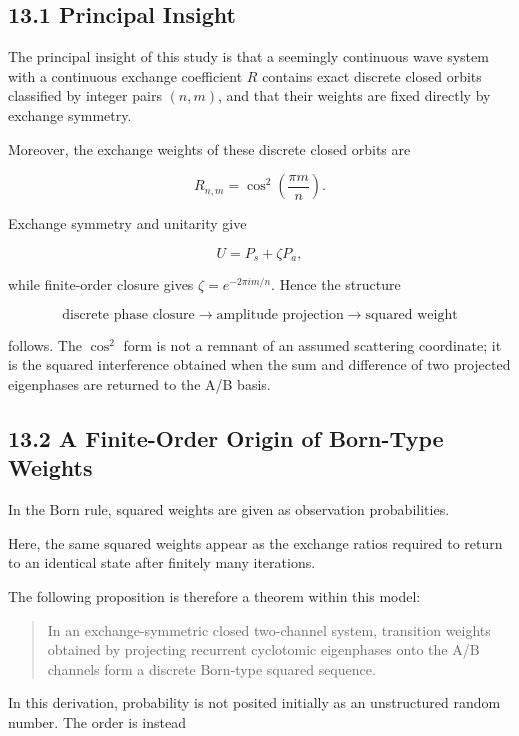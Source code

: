 \documentclass[
  a4paper,
  10pt]{article}
\begin{document}
\subsection{13.1 Principal Insight}\label{131-principal-insight}

The principal insight of this study is that a seemingly continuous wave
system with a continuous exchange coefficient \(R\) contains exact
discrete closed orbits classified by integer pairs \((n,m)\), and that
their weights are fixed directly by exchange symmetry.

Moreover, the exchange weights of these discrete closed orbits are

\[
R_{n,m}=\cos^2\left(\frac{\pi m}{n}\right).
\]

Exchange symmetry and unitarity give

\[
U=P_s+\zeta P_a,
\]

while finite-order closure gives \(\zeta=e^{-2\pi im/n}\). Hence the
structure

\[
\text{discrete phase closure}
\longrightarrow
\text{amplitude projection}
\longrightarrow
\text{squared weight}
\]

follows. The \(\cos^2\) form is not a remnant of an assumed scattering
coordinate; it is the squared interference obtained when the sum and
difference of two projected eigenphases are returned to the A/B basis.

\subsection{13.2 A Finite-Order Origin of Born-Type
Weights}\label{132-a-finite-order-origin-of-born-type-weights}

In the Born rule, squared weights are given as observation
probabilities.

Here, the same squared weights appear as the exchange ratios required to
return to an identical state after finitely many iterations.

The following proposition is therefore a theorem within this model:

\begin{quote}
In an exchange-symmetric closed two-channel system, transition weights
obtained by projecting recurrent cyclotomic eigenphases onto the A/B
channels form a discrete Born-type squared sequence.
\end{quote}

In this derivation, probability is not posited initially as an
unstructured random number. The order is instead
\end{document}
